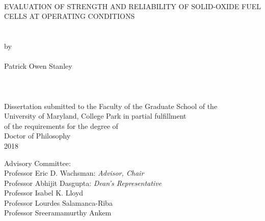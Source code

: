 

\thispagestyle{empty}
\hbox{\ }
\vspace{1in}
\renewcommand{\baselinestretch}{1}
\small\normalsize
\begin{center}

\large{{EVALUATION OF STRENGTH AND RELIABILITY OF SOLID-OXIDE FUEL CELLS AT OPERATING CONDITIONS}}\\
\ \\
\ \\
\large{by} \\
\ \\
\large{Patrick Owen Stanley}%
\ \\
\ \\
\ \\
\ \\
\normalsize
Dissertation submitted to the Faculty of the Graduate School of the \\
University of Maryland, College Park in partial fulfillment \\
of the requirements for the degree of \\
Doctor of Philosophy \\
2018
\end{center}

\vspace{7.5em}

\noindent Advisory Committee: \\
Professor Eric D. Wachsman: \textit{Advisor, Chair} \\
Professor Abhijit Dasgupta: \textit{Dean's Representative} \\
Professor Isabel K. Lloyd \\
Professor Lourdes Salamanca-Riba \\
Professor Sreeramamurthy Ankem

